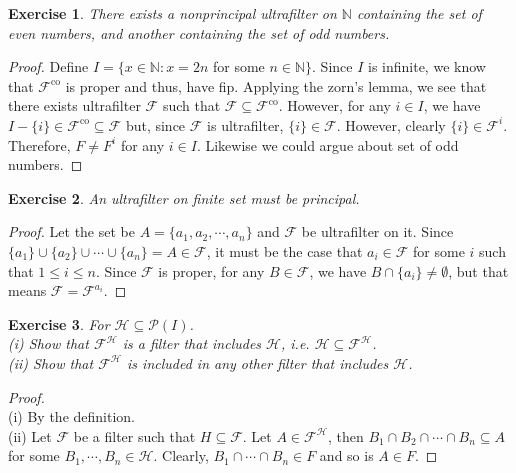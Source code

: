 \documentclass[a4paper, 11pt]{book}
\theoremstyle{plain}
\newtheorem{exercise}{Exercise}[chapter]
\theoremstyle{plain}
\newcommand{\mc}{\mathcal}
\newcommand{\ms}{\mathscr}
\newcommand{\co}{\text{co}}
\newcommand{\N}{\mathbb{N}}
\begin{document}
  \begin{exercise}
    There exists a nonprincipal ultrafilter on $\N$ containing the set of even numbers, and another containing the set of odd numbers.
  \end{exercise}
  \begin{proof}
    Define $I=\{x \in \N: x=2n$ for some $n \in \N\}$. Since $I$ is infinite, we know that $\mc{F}^\co$ is proper and thus, have fip. Applying the zorn's lemma, we see that there exists ultrafilter $\mc{F}$ such that $\mc{F} \subseteq \mc{F}^\co$. However, for any $i \in I$, we have $I-\{i\} \in \mc{F}^\co \subseteq \mc{F}$ but, since $\mc{F}$ is ultrafilter, $\{i\} \in \mc{F}$. However, clearly $\{i\} \in \mc{F}^i$. Therefore, $F \not = F^i$ for any $i \in I$. Likewise we could argue about set of odd numbers.
  \end{proof}

  \begin{exercise}
    An ultrafilter on finite set must be principal.
  \end{exercise}
  \begin{proof}
    Let the set be $A=\{a_1,a_2,\cdots, a_n\}$ and $\mc{F}$ be ultrafilter on it. Since $\{a_1\} \cup \{a_2\}\cup \cdots \cup \{a_n\}=A \in \mc{F}$, it must be the case that $a_i \in \mc{F}$ for some $i$ such that $1 \leq i \leq n$. Since $\mc{F}$ is proper, for any $B \in \mc{F}$, we have $B \cap \{a_i\} \not = \emptyset$, but that means $\mc{F}=\mc{F}^{a_i}$.
  \end{proof}

  \begin{exercise}
    For $\mc{H} \subseteq \ms{P}(I)$. \\
      (i) Show that $\mc{F}^\mc{H}$ is a filter that includes $\mc{H}$, i.e. $\mc{H} \subseteq \mc{F}^\mc{H}$. \\
      (ii) Show that $\mc{F}^\mc{H}$ is included in any other filter that includes $\mc{H}$.
  \end{exercise}
  \begin{proof} $ $ \\
    (i) By the definition.\\
    (ii) Let $\mc{F}$ be a filter such that $H \subseteq \mc{F}$. Let $A \in \mc{F}^\mc{H}$, then $B_1 \cap B_2 \cap \cdots \cap B_n \subseteq A$ for some $B_1,\cdots, B_n \in \mc{H}$. Clearly, $B_1 \cap \cdots \cap B_n \in F$ and so is $A \in F$.
  \end{proof}
\end{document}
